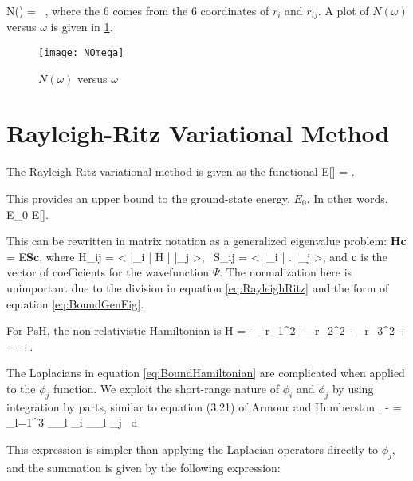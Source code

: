 \documentclass[Dissertation.tex]{subfiles}
\begin{document}
\beq
\label{eq:NumberTermsOmega}
N(\omega) =  \, ,
\eeq
\noindent where the 6 comes from the 6 coordinates of $r_i$ and $r_{ij}$.  A plot of $N(\omega)$ versus $\omega$ is given in \cref{fig:NOmega}.

\begin{figure}[H]
	\centering
	\texttt{[image: NOmega]}
	\caption{$N(\omega)$ versus $\omega$}
	\label{fig:NOmega}
\end{figure}


\section{Rayleigh-Ritz Variational Method}
The Rayleigh-Ritz variational method is given as the functional
\beq
\label{eq:RayleighRitz}
E[\Psi] = .
\eeq

\noindent This provides an upper bound to the ground-state energy, $E_0$.  In other words,
\beq
E_0 \leq E[\Psi].
\eeq

This can be rewritten in matrix notation as a generalized eigenvalue problem: \cite{}
\beq
\label{eq:BoundGenEig}
\textbf{Hc} = E\textbf{Sc},
\eeq
where
\beq
\label{eq:HijSij}
H_{ij} = \left< \bar{\phi}_i \left| H \right| \bar{\phi}_j \right>\!, \, S_{ij} = \left< \bar{\phi}_i \left| \right.\! \bar{\phi}_j \right>, 
\eeq
and \textbf{c} is the vector of coefficients for the wavefunction $\Psi$.  The normalization here is unimportant due to the division in equation \ref{eq:RayleighRitz} and the form of equation \ref{eq:BoundGenEig}.

For PsH, the non-relativistic Hamiltonian is
\beq
\label{eq:BoundHamiltonian}
H = - \nabla_{r_1}^2 -  \nabla_{r_2}^2 -  \nabla_{r_3}^2 + ----+.
\eeq

The Laplacians in equation \ref{eq:BoundHamiltonian} are complicated when applied to the $\phi_j$ function.  We exploit the short-range nature of $\phi_i$ and $\phi_j$ by using integration by parts, similar to equation (3.21) of Armour and Humberston \cite{Armour1991}.
\beq
\label{eq:BoundGradient}
- = \int \sum_{l=1}^3 \bm{\nabla}_{\!_l} \phi_i \bm{\cdot} \bm{\nabla}_{\!_l} \phi_j \, d\tau
\eeq

\noindent This expression is simpler than applying the Laplacian operators directly to $\phi_j$, and the summation is given by the following expression:
\end{document}
